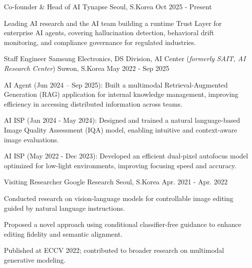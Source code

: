 

\begin{cventries}

  \cventry
    {Co-founder \& Head of AI} %
    {Tynapse} %
    {Seoul, S.Korea} %
    {Oct 2025 - Present} %
    {
      \begin{cvitems} %
        \item {Leading AI research and the AI team building a runtime Trust Layer for enterprise AI agents, covering hallucination detection, behavioral drift monitoring, and compliance governance for regulated industries.}
      \end{cvitems}
    }

  \cventry
    {Staff Engineer} %
    {Samsung Electronics, DS Division, AI Center (\textit{formerly SAIT, AI Research Center})} %
    {Suwon, S.Korea} %
    {May 2022 - Sep 2025} %
    {
      \begin{cvitems} %
        \item {AI Agent (Jun 2024 – Sep 2025): Built a multimodal Retrieval-Augmented Generation (RAG) application for internal knowledge management, improving efficiency in accessing distributed information across teams.}
        \item {AI ISP (Jan 2024 - May 2024): Designed and trained a natural language-based Image Quality Assessment (IQA) model, enabling intuitive and context-aware image evaluations.}
        \item {AI ISP (May 2022 - Dec 2023): Developed an efficient dual-pixel autofocus model optimized for low-light environments, improving focusing speed and accuracy.}
      \end{cvitems}
    }

  \cventry
    {Visiting Researcher} %
    {Google Research} %
    {Seoul, S.Korea} %
    {Apr. 2021 - Apr. 2022} %
    {
      \begin{cvitems} %
        \item {Conducted research on vision-language models for controllable image editing guided by natural language instructions.}
        \item {Proposed a novel approach using conditional classifier-free guidance to enhance editing fidelity and semantic alignment.}
        \item {Published at ECCV 2022; contributed to broader research on multimodal generative modeling.}
      \end{cvitems}
    }


\end{cventries}
